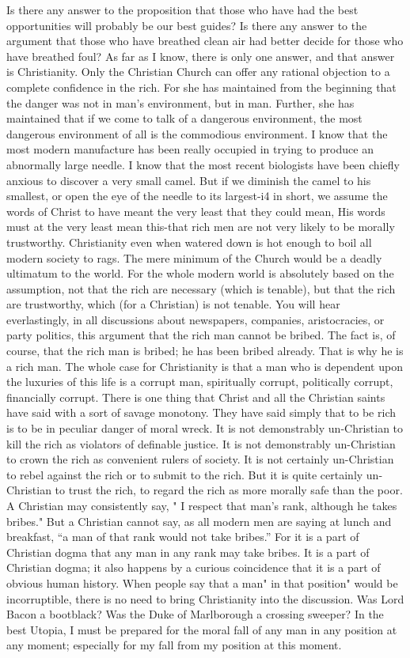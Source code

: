 \documentclass{book}
\begin{document}
Is there any answer to the proposition that those who have had the best opportunities will probably be our best guides? Is there any answer to the argument that those who have breathed clean air had better decide for those who have breathed foul? As far as I know, there is only one answer, and that answer is Christianity. Only the Christian Church can offer any rational objection to a complete confidence in the rich. For she has maintained from the beginning that the danger was not in man’s environment, but in man. Further, she has maintained that if we come to talk of a dangerous environment, the most dangerous environment of all is the commodious environment. I know that the most modern manufacture has been really occupied in trying to produce an abnormally large needle. I know that the most recent biologists have been chiefly anxious to discover a very small camel. But if we diminish the camel to his smallest, or open the eye of the needle to its largest-i4 in short, we assume the words of Christ to have meant the very least that they could mean, His words must at the very least mean this-that rich men are not very likely to be morally trustworthy. Christianity even when watered down is hot enough to boil all modern society to rags. The mere minimum of the Church would be a deadly ultimatum to the world. For the whole modern world is absolutely based on the assumption, not that the rich are necessary (which is tenable), but that the rich are trustworthy, which (for a Christian) is not tenable. You will hear everlastingly, in all discussions about newspapers, companies, aristocracies, or party politics, this argument that the rich man cannot be bribed. The fact is, of course, that the rich man is bribed; he has been bribed already. That is why he is a rich man. The whole case for Christianity is that a man who is dependent upon the luxuries of this life is a corrupt man, spiritually corrupt, politically corrupt, financially corrupt. There is one thing that Christ and all the Christian saints have said with a sort of savage monotony. They have said simply that to be rich is to be in peculiar danger of moral wreck. It is not demonstrably un-Christian to kill the rich as violators of definable justice. It is not demonstrably un-Christian to crown the rich as convenient rulers of society. It is not certainly un-Christian to rebel against the rich or to submit to the rich. But it is quite certainly un-Christian to trust the rich, to regard the rich as more morally safe than the poor. A Christian may consistently say, " I respect that man’s rank, although he takes bribes." But a Christian cannot say, as all modern men are saying at lunch and breakfast, “a man of that rank would not take bribes.” For it is a part of Christian dogma that any man in any rank may take bribes. It is a part of Christian dogma; it also happens by a curious coincidence that it is a part of obvious human history. When people say that a man" in that position" would be incorruptible, there is no need to bring Christianity into the discussion. Was Lord Bacon a bootblack? Was the Duke of Marlborough a crossing sweeper? In the best Utopia, I must be prepared for the moral fall of any man in any position at any moment; especially for my fall from my position at this moment.
\end{document}
